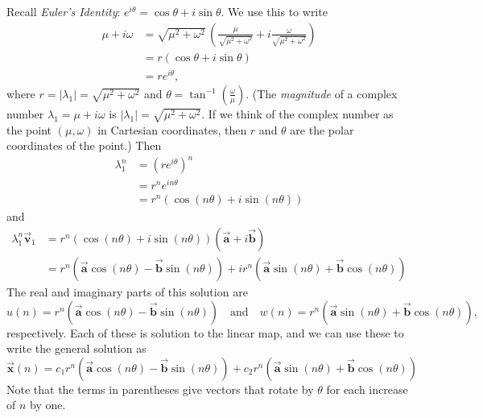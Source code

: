 \documentclass[reqno]{immbook}
\newcommand{\BA}{\vec{\textbf{a}}}
\newcommand{\BB}{\vec{\textbf{b}}}
\newcommand{\BV}{\vec{\textbf{v}}}
\newcommand{\BX}{\vec{\textbf{x}}}
\numberwithin{equation}{chapter}
\numberwithin{question}{section}
\numberwithin{theorem}{chapter}
\numberwithin{figure}{chapter}
\theoremstyle{definition}
\begin{document}
Recall \emph{Euler's Identity}:
 $e^{i\theta} = \cos \theta + i \sin\theta$.
We use this to write
\begin{equation}
\begin{split}
  \mu + i \omega & = \sqrt{\mu^2+\omega^2}\,
                      \left(\frac{\mu}{\sqrt{\mu^2+\omega^2}} +
		            i \frac{\omega}{\sqrt{\mu^2+\omega^2}}\right) \\
	         & = r (\cos\theta + i \sin\theta) \\
		 & = r e^{i\theta}, 
\end{split}
\end{equation}
where $r = |\lambda_1| = \sqrt{\mu^2+\omega^2}$
and $\theta = \tan^{-1}\left(\frac{\omega}{\mu}\right)$.
(The \emph{magnitude} of a complex number
$\lambda_1=\mu+i\omega$ is $|\lambda_1|=\sqrt{\mu^2+\omega^2}$.
If we think of the complex number as the point $(\mu,\omega)$
in Cartesian coordinates, then $r$ and $\theta$ are the
polar coordinates of the point.)
Then
\begin{equation}
\begin{split}
  \lambda_1^n & = (re^{i\theta})^n  \\
              & = r^n e^{in\theta}  \\
	      & = r^n(\cos(n\theta) + i \sin(n\theta))
\end{split}
\end{equation}
and
\begin{equation}
\begin{split}
   \lambda_1^n\BV_1 & = r^n(\cos(n\theta) + i \sin(n\theta))(\BA+i\BB) \\
     & = r^n(\BA\cos(n\theta)-\BB\sin(n\theta)) +
          i r^n(\BA\sin(n\theta)+\BB\cos(n\theta))
\end{split}
\end{equation}
The real and imaginary parts of this solution are
\begin{equation}
  u(n) = r^n(\BA\cos(n\theta)-\BB\sin(n\theta))
  \quad \textrm{and} \quad
  w(n) = r^n(\BA\sin(n\theta)+\BB\cos(n\theta)),
\end{equation}
respectively.
Each of these is solution to the linear map, and
we can use these to write the general solution as
\begin{equation}
  \BX(n) =    c_1 r^n(\BA\cos(n\theta)-\BB\sin(n\theta))
           + c_2 r^n(\BA\sin(n\theta)+\BB\cos(n\theta))
\end{equation}
Note that the terms in parentheses give vectors that
rotate by $\theta$ for each increase of $n$ by one.
\end{document}
